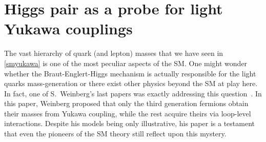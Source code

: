 
\chapter{ Higgs pair as a probe for light Yukawa couplings }\label{chap:lightyuk}
The vast hierarchy of quark  (and lepton) masses that we have seen in~ \autoref{smyukawa} is one of the most peculiar aspects of the SM.  One might wonder whether the Braut-Englert-Higgs mechanism is actually responsible for the light quarks mass-generation or there exist other physics beyond the SM at play here. In fact, one of S.~Weinberg's last papers was exactly addressing this question~\cite{Weinberg:2020zba}. In this paper, Weinberg proposed that only the third generation fermions obtain their masses from Yukawa coupling, while the rest acquire theirs via loop-level interactions. Despite his models being only illustrative, his paper is a testament that even  the pioneers of the SM theory still reflect upon this mystery. \\
